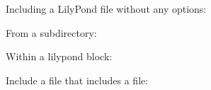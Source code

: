 \documentclass{article}
\begin{document}
Including a LilyPond file without any options:

{%
\parindent 0pt
\noindent
\ifx\preLilyPondExample \undefined
\else
  \expandafter\preLilyPondExample
\fi
\def\lilypondbook{}%

\ifx\postLilyPondExample \undefined
\else
  \expandafter\postLilyPondExample
\fi
}

From a subdirectory:

{%
\parindent 0pt
\noindent
\ifx\preLilyPondExample \undefined
\else
  \expandafter\preLilyPondExample
\fi
\def\lilypondbook{}%

\ifx\postLilyPondExample \undefined
\else
  \expandafter\postLilyPondExample
\fi
}

Within a lilypond block:

{%
\parindent 0pt
\noindent
\ifx\preLilyPondExample \undefined
\else
  \expandafter\preLilyPondExample
\fi
\def\lilypondbook{}%

\ifx\postLilyPondExample \undefined
\else
  \expandafter\postLilyPondExample
\fi
}

Include a file that includes a file:

{%
\parindent 0pt
\noindent
\ifx\preLilyPondExample \undefined
\else
  \expandafter\preLilyPondExample
\fi
\def\lilypondbook{}%

\ifx\postLilyPondExample \undefined
\else
  \expandafter\postLilyPondExample
\fi
}
\end{document}
